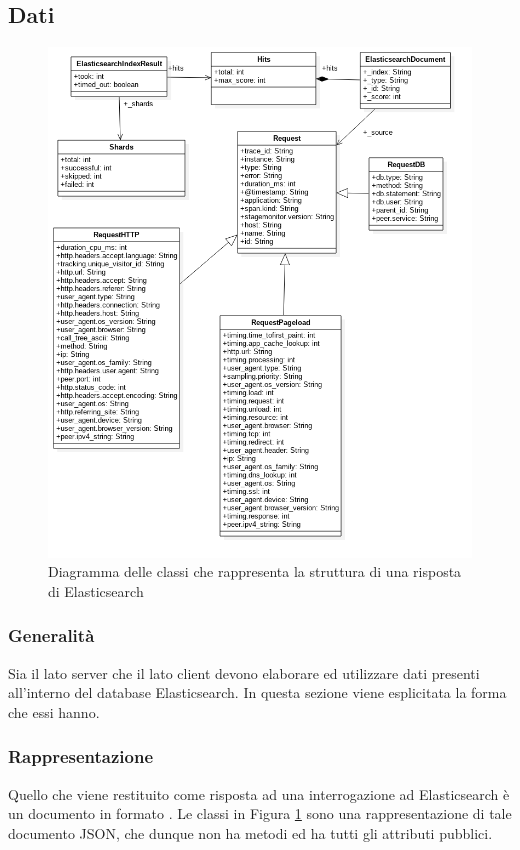 \subsection{Dati}


\begin{figure}[H]
    \centering
    \includegraphics[width=1\textwidth]{Images/classiDati.png}
    \caption{Diagramma delle classi  che rappresenta la struttura di una risposta di Elasticsearch}
    \label{img:dati}
\end{figure}

\subsubsection{Generalità}
Sia il lato server che il lato client devono elaborare ed utilizzare dati presenti all'interno del database Elasticsearch. In questa sezione viene esplicitata la forma che essi hanno.

\subsubsection{Rappresentazione}
Quello che viene restituito come risposta ad una interrogazione ad Elasticsearch è un documento in formato . Le classi in Figura \ref{img:dati} sono una rappresentazione di tale documento JSON, che dunque non ha metodi ed ha tutti gli attributi pubblici.

